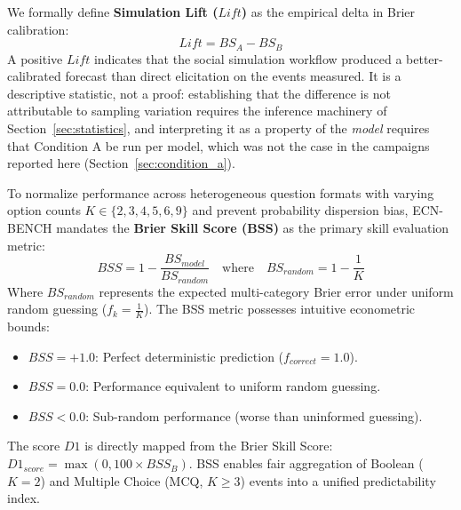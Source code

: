 \documentclass[11pt,journal,onecolumn]{IEEEtran}
\begin{document}
We formally define \textbf{Simulation Lift ($Lift$)} as the empirical delta in Brier calibration:
\begin{equation}
    Lift = BS_A - BS_B
\end{equation}
A positive $Lift$ indicates that the social simulation workflow produced a better-calibrated forecast than direct elicitation on the events measured. It is a descriptive statistic, not a proof: establishing that the difference is not attributable to sampling variation requires the inference machinery of Section~\ref{sec:statistics}, and interpreting it as a property of the \emph{model} requires that Condition A be run per model, which was not the case in the campaigns reported here (Section~\ref{sec:condition_a}).

To normalize performance across heterogeneous question formats with varying option counts $K \in \{2, 3, 4, 5, 6, 9\}$ and prevent probability dispersion bias, ECN-BENCH mandates the \textbf{Brier Skill Score (BSS)} as the primary skill evaluation metric:
\begin{equation}
    BSS = 1 - \frac{BS_{model}}{BS_{random}} \quad \text{where} \quad BS_{random} = 1 - \frac{1}{K}
\end{equation}
Where $BS_{random}$ represents the expected multi-category Brier error under uniform random guessing ($f_k = \frac{1}{K}$). The BSS metric possesses intuitive econometric bounds:
\begin{itemize}
    \item $BSS = +1.0$: Perfect deterministic prediction ($f_{correct} = 1.0$).
    \item $BSS = 0.0$: Performance equivalent to uniform random guessing.
    \item $BSS < 0.0$: Sub-random performance (worse than uninformed guessing).
\end{itemize}
The score $D1$ is directly mapped from the Brier Skill Score: $D1_{score} = \max(0, 100 \times BSS_B)$. BSS enables fair aggregation of Boolean ($K=2$) and Multiple Choice (MCQ, $K \ge 3$) events into a unified predictability index.
\end{document}
